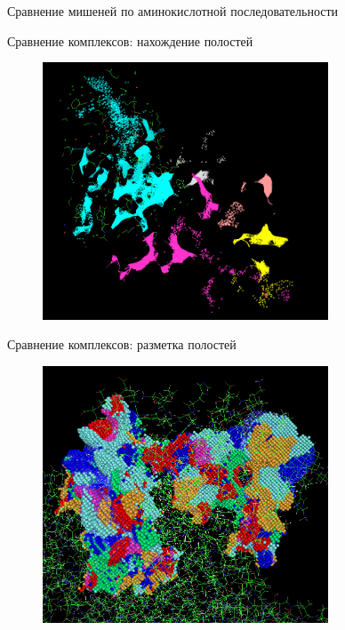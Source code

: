 \documentclass[14pt]{beamer}
\begin{document}
\begin{frame}{Сравнение мишеней по аминокислотной последовательности}

\end{frame}

\begin{frame}{Сравнение комплексов: нахождение полостей}
	\begin{figure}
		\centering
		\includegraphics[width=85mm]{../pictures/clefts}		
	\end{figure}
\end{frame}

\begin{frame}{Сравнение комплексов: разметка полостей}
	\begin{figure}
		\centering
		\includegraphics[width=85mm]{../pictures/mif}
\end{figure}
\end{frame}
\end{document}
